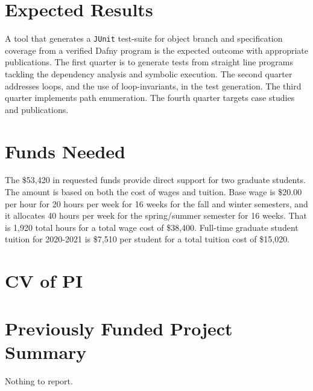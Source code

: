 \documentclass[11pt,onecolumn,notitlepage]{article}
\begin{document}
\section*{Expected Results}
A tool that generates a \texttt{JUnit} test-suite for object branch and specification coverage from a verified Dafny program is the expected outcome with appropriate publications. The first quarter is to generate tests from straight line programs tackling the dependency analysis and symbolic execution. The second quarter addresses loops, and the use of loop-invariants, in the test generation. The third quarter implements path enumeration. The fourth quarter targets case studies and publications.

\section*{Funds Needed}

The \$53,420 in requested funds provide direct support for two graduate students. The amount is based on both the cost of wages and tuition. Base wage is \$20.00 per hour for 20 hours per week for 16 weeks for the fall and winter semesters, and it allocates 40 hours per week for the spring/summer semester for 16 weeks. That is 1,920 total hours for a total wage cost of \$38,400. Full-time graduate student tuition for 2020-2021 is \$7,510 per student for a total tuition cost of \$15,020. 

\appendix
\appendixpage




\section{CV of PI}

\section{Previously Funded Project Summary}
Nothing to report.
\end{document}
